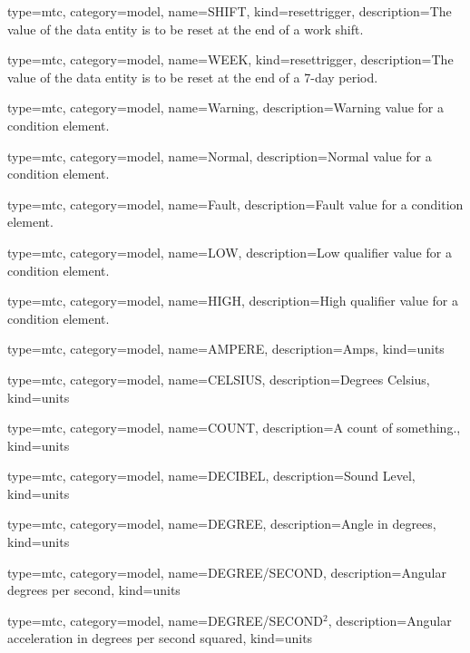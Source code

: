 {
  type=mtc,
  category=model,
  name={SHIFT},
  kind={resettrigger},
  description={The value of the \gls{data entity} is to be reset at the end of a work shift.}
}


{
  type=mtc,
  category=model,
  name={WEEK},
  kind={resettrigger},
  description={The value of the \gls{data entity} is to be reset at the end of a 7-day period.}
}


{
  type=mtc,
  category=model,
  name={Warning},
  description={Warning value for a \gls{condition} element.}
}


{
  type=mtc,
  category=model,
  name={Normal},
  description={Normal value for a \gls{condition} element.}
}


{
  type=mtc,
  category=model,
  name={Fault},
  description={Fault value for a \gls{condition} element.}
}


{
  type=mtc,
  category=model,
  name={LOW},
  description={Low \gls{qualifier} value for a \gls{condition} element.}
}


{
  type=mtc,
  category=model,
  name={HIGH},
  description={High \gls{qualifier} value for a \gls{condition} element.}
}


{
  type=mtc,
  category=model,
  name={AMPERE},
  description={Amps},
  kind={units}
}


{
  type=mtc,
  category=model,
  name={CELSIUS},
  description={Degrees Celsius},
  kind={units}
}


{
  type=mtc,
  category=model,
  name={COUNT},
  description={A count of something.},
  kind={units}
}


{
  type=mtc,
  category=model,
  name={DECIBEL},
  description={Sound Level},
  kind={units}
}


{
  type=mtc,
  category=model,
  name={DEGREE},
  description={Angle in degrees},
  kind={units}
}


{
  type=mtc,
  category=model,
  name={DEGREE/SECOND},
  description={Angular degrees per second},
  kind={units}
}


{
  type=mtc,
  category=model,
  name={DEGREE/SECOND$^2$},
  description={Angular acceleration in degrees per second squared},
  kind={units}
}


